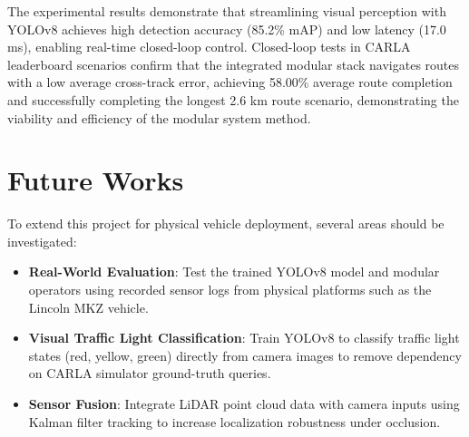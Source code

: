 \documentclass[11pt,a4paper]{report}
\begin{document}
The experimental results demonstrate that streamlining visual perception with YOLOv8 achieves high detection accuracy (85.2\% mAP) and low latency (17.0 ms), enabling real-time closed-loop control. Closed-loop tests in CARLA leaderboard scenarios confirm that the integrated modular stack navigates routes with a low average cross-track error, achieving 58.00\% average route completion and successfully completing the longest 2.6 km route scenario, demonstrating the viability and efficiency of the modular system method.

\section{Future Works}
To extend this project for physical vehicle deployment, several areas should be investigated:
\begin{itemize}
    \item \textbf{Real-World Evaluation}: Test the trained YOLOv8 model and modular operators using recorded sensor logs from physical platforms such as the Lincoln MKZ vehicle.
    \item \textbf{Visual Traffic Light Classification}: Train YOLOv8 to classify traffic light states (red, yellow, green) directly from camera images to remove dependency on CARLA simulator ground-truth queries.
    \item \textbf{Sensor Fusion}: Integrate LiDAR point cloud data with camera inputs using Kalman filter tracking to increase localization robustness under occlusion.
\end{itemize}
\newpage
\nocite{}
\thispagestyle{noNumber}


\end{document}
